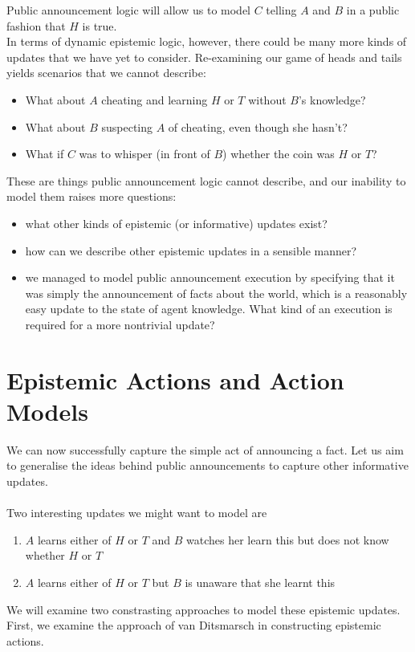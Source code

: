 \documentclass[10pt, a4paper, twoside]{article}
\begin{document}
Public announcement logic will allow us to model $C$ telling $A$ and $B$ in a
public fashion that $H$ is true.
\\
In terms of dynamic epistemic logic, however, there could be many more kinds of
updates that we have yet to consider.
Re-examining our game of heads and tails yields scenarios that we cannot
describe:
\begin{itemize}
	\item What about $A$ cheating and learning $H$ or $T$ without $B$'s knowledge?
	\item What about $B$ suspecting $A$ of cheating, even though she hasn't?
	\item What if $C$ was to whisper (in front of $B$) whether the coin was $H$
	or $T$?
\end{itemize}
These are things public announcement logic cannot describe, and our inability to
model them raises more questions:
\begin{itemize}
	\item what other kinds of epistemic (or informative) updates exist?
	\item how can we describe other epistemic updates in a sensible manner?
	\item we managed to model public announcement execution by specifying that it
	was simply the announcement of facts about the world, which is a reasonably
	easy update to the state of agent knowledge. What kind of an execution is
	required for a more nontrivial update?
\end{itemize}

\section{Epistemic Actions and Action Models} \label{estAct}
We can now successfully capture the simple act of announcing a fact.
Let us aim to generalise the ideas behind public announcements to capture other
informative updates.\\
\\
Two interesting updates we might want to model are
\begin{enumerate}
  \item $A$ learns either of $H$ or $T$ and $B$ watches her learn this but does
  not know whether $H$ or $T$
  \item $A$ learns either of $H$ or $T$ but $B$ is unaware that she learnt this
\end{enumerate}
We will examine two constrasting approaches to model these epistemic updates.
First, we examine the approach of van Ditsmarsch in constructing epistemic
actions.
\end{document}
